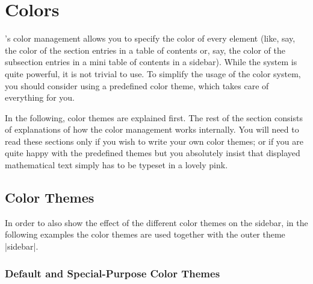 %
%
%

\section{Colors}

\label{section-colors}

\beamer's color management allows you to specify the color of every element (like, say, the color of the section entries in a table of contents or, say, the color of the subsection entries in a mini table of contents in a sidebar). While the system is quite powerful, it is not trivial to use. To simplify the usage of the color system, you should consider using a predefined color theme, which takes care of everything for you.

In the following, color themes are explained first. The rest of the section consists of explanations of how the color management works internally. You will need to read these sections only if you wish to write your own color themes; or if you are quite happy with the predefined themes but you absolutely insist that displayed mathematical text simply has to be typeset in a lovely pink.


\subsection{Color Themes}

In order to also show the effect of the different color themes on the sidebar, in the following examples the color themes are used together with the outer theme |sidebar|.

\subsubsection{Default and Special-Purpose Color Themes}

